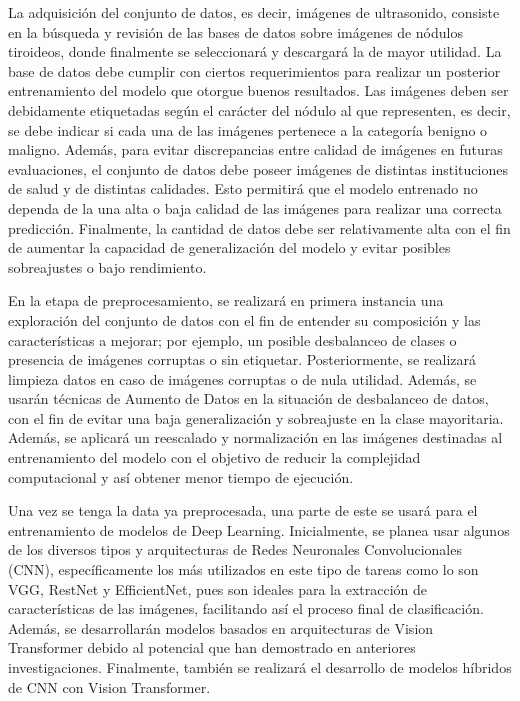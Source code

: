 La adquisición del conjunto de datos, es decir, imágenes de ultrasonido, consiste en la búsqueda y revisión de las bases de datos sobre imágenes de nódulos tiroideos, donde finalmente se seleccionará y descargará la de mayor utilidad. La base de datos debe cumplir con ciertos requerimientos para realizar un posterior entrenamiento del modelo que otorgue buenos resultados. Las imágenes deben ser debidamente etiquetadas según el carácter del nódulo al que representen, es decir, se debe indicar si cada una de las imágenes pertenece a la categoría benigno o maligno. Además, para evitar discrepancias entre calidad de imágenes en futuras evaluaciones, el conjunto de datos debe poseer imágenes de distintas instituciones de salud y de distintas calidades. Esto permitirá que el modelo entrenado no dependa de la una alta o baja calidad de las imágenes para realizar una correcta predicción. Finalmente, la cantidad de datos debe ser relativamente alta con el fin de aumentar la capacidad de generalización del modelo y evitar posibles sobreajustes o bajo rendimiento.  

En la etapa de preprocesamiento, se realizará en primera instancia una exploración del conjunto de datos con el fin de entender su composición y las características a mejorar; por ejemplo, un posible desbalanceo de clases o presencia de imágenes corruptas o sin etiquetar. Posteriormente, se realizará limpieza datos en caso de imágenes corruptas o de nula utilidad. Además, se usarán técnicas de Aumento de Datos en la situación de desbalanceo de datos, con el fin de evitar una baja generalización y sobreajuste en la clase mayoritaria. Además, se aplicará un reescalado y normalización en las imágenes destinadas al entrenamiento del modelo con el objetivo de reducir la complejidad computacional y así obtener menor tiempo de ejecución.

Una vez se tenga la data ya preprocesada, una parte de este se usará para el entrenamiento de modelos de Deep Learning. Inicialmente, se planea usar algunos de los diversos tipos y arquitecturas de Redes Neuronales Convolucionales (CNN), específicamente los más utilizados en este tipo de tareas como lo son VGG, RestNet y EfficientNet, pues son ideales para la extracción de características de las imágenes, facilitando así el proceso final de clasificación. Además, se desarrollarán modelos basados en arquitecturas de Vision Transformer debido al potencial que han demostrado en anteriores investigaciones. Finalmente, también se realizará el desarrollo de modelos híbridos de CNN con Vision Transformer. %

